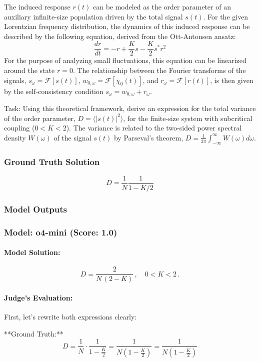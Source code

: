 \documentclass[10pt]{article}
\begin{document}
The induced response $r(t)$ can be modeled as the order parameter of an auxiliary infinite-size population driven by the total signal $s(t)$. For the given Lorentzian frequency distribution, the dynamics of this induced response can be described by the following equation, derived from the Ott-Antonsen ansatz:
$$ \frac{dr}{dt} = -r + \frac{K}{2}s - \frac{K}{2}s^*r^2 $$
For the purpose of analyzing small fluctuations, this equation can be linearized around the state $r=0$. The relationship between the Fourier transforms of the signals, $s_\omega = \mathcal{F}[s(t)]$, $w_{0,\omega} = \mathcal{F}[\chi_0(t)]$, and $r_\omega = \mathcal{F}[r(t)]$, is then given by the self-consistency condition $s_\omega = w_{0,\omega} + r_\omega$.

Task:
Using this theoretical framework, derive an expression for the total variance of the order parameter, $D = \langle |s(t)|^2 \rangle$, for the finite-size system with subcritical coupling ($0 < K < 2$). The variance is related to the two-sided power spectral density $W(\omega)$ of the signal $s(t)$ by Parseval's theorem, $D = \frac{1}{2\pi} \int_{-\infty}^{\infty} W(\omega) d\omega$.

\subsubsection*{Ground Truth Solution}
\[ \boxed{D=\frac{1}{N}\frac{1}{1-K/2}} \]

\subsubsection*{Model Outputs}
\subsubsection*{Model: o4-mini (Score: 1.0)}
\paragraph*{Model Solution:}
\[ D=\frac{2}{N\,(2-K)}\,,\quad 0<K<2\,. \]

\paragraph*{Judge's Evaluation:}

First, let's rewrite both expressions clearly:

**Ground Truth:**
\[
D = \frac{1}{N} \cdot \frac{1}{1 - \frac{K}{2}} = \frac{1}{N(1 - \frac{K}{2})} = \frac{1}{N \left(1 - \frac{K}{2}\right)}
\]
\end{document}
